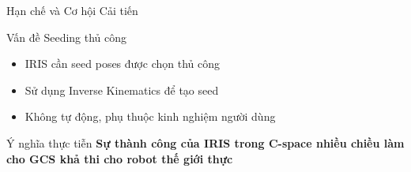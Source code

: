 \documentclass[aspectratio=169]{beamer}
\begin{document}
\begin{frame}{Hạn chế và Cơ hội Cải tiến}

    \begin{alertblock}{Vấn đề Seeding thủ công}
        \begin{itemize}
            \item IRIS cần seed poses được chọn thủ công
            \item Sử dụng Inverse Kinematics để tạo seed
            \item Không tự động, phụ thuộc kinh nghiệm người dùng
        \end{itemize}
    \end{alertblock}


    \begin{block}{Ý nghĩa thực tiễn}
        \textbf{Sự thành công của IRIS trong C-space nhiều chiều làm cho GCS khả thi cho robot thế giới thực}
    \end{block}

\end{frame}
\end{document}
